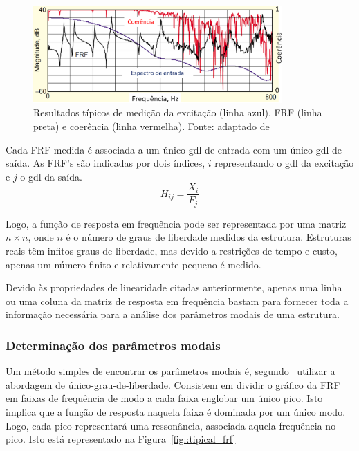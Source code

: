 \begin{figure}[h]
	\centering 
 	\includegraphics[width=0.85\textwidth]{figs/coerencia}
 	\caption[Resultados típicos de medição da excitação, FRF e
 	coerência]{Resultados típicos de medição da excitação (linha azul), FRF
 	(linha preta) e coerência (linha vermelha).	Fonte: adaptado de
 	\cite{avitabile2001experimental}}
 	\label{fig::coerencia}
\end{figure}

Cada FRF medida é associada a um único gdl de entrada com um único gdl de saída.
As FRF's são indicadas por dois índices, $i$ representando o gdl da excitação e
$j$ o gdl da saída.
%
\begin{equation}
	H_{ij} = \frac{X_i}{F_j}
\end{equation}

Logo, a função de resposta em frequência pode ser representada por uma matriz $n
\times n$, onde $n$ é o número de graus de liberdade medidos da estrutura.
Estruturas reais têm infitos graus de liberdade, mas devido a restrições de
tempo e custo, apenas um número finito e relativamente pequeno é medido.

Devido às propriedades de linearidade citadas anteriormente, apenas uma linha ou
uma coluna da matriz de resposta em frequência bastam para fornecer toda a
informação necessária para a análise dos parâmetros modais de uma estrutura.


\subsubsection{Determinação dos parâmetros modais}

Um método simples de encontrar os parâmetros modais é,
segundo~\citet{rao2011mechanical} utilizar a abordagem de
único-grau-de-liberdade. Consistem em dividir o gráfico da FRF em faixas de
frequência de modo a cada faixa englobar um único pico. Isto implica que a
função de resposta naquela faixa é dominada por um único modo. Logo, cada pico
representará uma ressonância, associada aquela frequência no pico. Isto está
representado na Figura~\ref{fig::tipical_frf}

